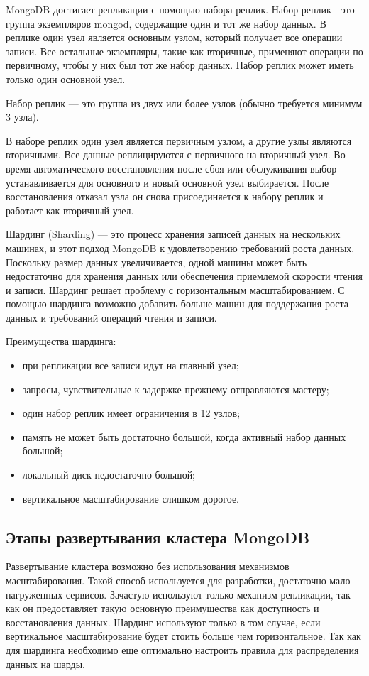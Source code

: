 MongoDB достигает репликации с помощью набора реплик. Набор реплик - это группа экземпляров mongod, содержащие один и тот же набор данных. В реплике один узел является основным узлом, который получает все операции записи. Все остальные экземпляры, такие как вторичные, применяют операции по первичному, чтобы у них был тот же набор данных. Набор реплик может иметь только один основной узел.

Набор реплик --- это группа из двух или более узлов (обычно требуется минимум 3 узла).

В наборе реплик один узел является первичным узлом, а другие узлы являются вторичными. Все данные реплицируются с первичного на вторичный узел.
Во время автоматического восстановления после сбоя или обслуживания выбор устанавливается для основного и новый основной узел выбирается. После восстановления отказал узла он снова присоединяется к набору реплик и работает как вторичный узел.

Шардинг (Sharding) --- это процесс хранения записей данных на нескольких машинах, и этот подход MongoDB к удовлетворению требований роста данных. Поскольку размер данных увеличивается, одной машины может быть недостаточно для хранения данных или обеспечения приемлемой скорости чтения и записи. Шардинг решает проблему с горизонтальным масштабированием. С помощью шардинга возможно добавить больше машин для поддержания роста данных и требований операций чтения и записи.

Преимущества шардинга:
\begin{itemize}
	\item при репликации все записи идут на главный узел;
	\item запросы, чувствительные к задержке прежнему отправляются мастеру;
	\item один набор реплик имеет ограничения в 12 узлов;
	\item память не может быть достаточно большой, когда активный набор данных большой;
	\item локальный диск недостаточно большой;
	\item вертикальное масштабирование слишком дорогое.
\end{itemize}

\subsection{Этапы развертывания кластера MongoDB}
Развертывание кластера возможно без использования механизмов масштабирования. Такой способ используется для разработки, достаточно мало нагруженных сервисов. Зачастую используют только механизм репликации, так как он предоставляет такую ​​основную преимущества как доступность и восстановления данных. Шардинг используют только в том случае, если вертикальное масштабирование будет стоить больше чем горизонтальное. Так как для шардинга необходимо еще оптимально настроить правила для распределения данных на шарды.

